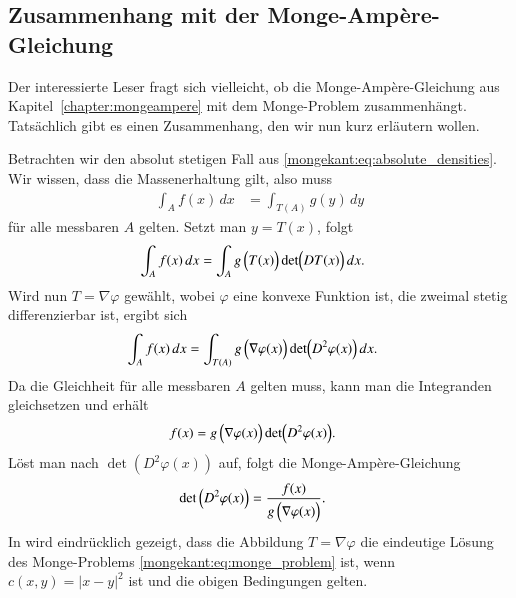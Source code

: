 \subsection{Zusammenhang mit der Monge-Ampère-Gleichung}
Der interessierte Leser fragt sich vielleicht,
ob die Monge-Ampère-Gleichung aus Kapitel~\ref{chapter:mongeampere}
mit dem Monge-Problem zusammenhängt.
Tatsächlich gibt es einen Zusammenhang,
den wir nun kurz erläutern wollen.

Betrachten wir den absolut stetigen Fall aus \eqref{mongekant:eq:absolute_densities}.
Wir wissen,
dass die Massenerhaltung gilt,
also muss
\begin{align*}
\int_{A} f(x) \, dx
&=
\int_{T(A)} g(y) \, dy
\end{align*}
für alle messbaren $A$ gelten.
Setzt man $y = T(x)$,
folgt
\begin{align*}
\int_{A} f(x) \, dx
&=
\int_{A} g\,\Bigl(T(x)\Bigr) \det\Bigl(DT(x)\Bigr) \, dx
.
\end{align*}
Wird nun $T = \nabla \varphi$ gewählt,
wobei $\varphi$ eine konvexe Funktion ist,
die zweimal stetig differenzierbar ist,
ergibt sich
\begin{align*}
\int_{A} f(x) \, dx
&=
\int_{T(A)} g\,\Bigl(\nabla \varphi(x)\Bigr) \det\Bigl(D^2 \varphi(x)\Bigr) \, dx
.
\end{align*}
Da die Gleichheit für alle messbaren $A$ gelten muss,
kann man die Integranden gleichsetzen und erhält
\begin{align*}
f(x)
&=
g\,\Bigl(\nabla \varphi(x)\Bigr) \det\Bigl(D^2 \varphi(x)\Bigr)
.
\end{align*}
Löst man nach $\det(D^2 \varphi(x))$ auf,
folgt die Monge-Ampère-Gleichung
\begin{align*}
\det\,\Bigl(D^2 \varphi(x)\Bigr)
&=
\frac{f(x)}{g\,\Bigl(\nabla \varphi(x)\Bigr)}
.
\end{align*}
In \cite{mongekant:brenier} wird eindrücklich gezeigt,
dass die Abbildung $T = \nabla \varphi$
die eindeutige Lösung des Monge-Problems \eqref{mongekant:eq:monge_problem} ist,
wenn $c(x,y) = \left\lvert x - y\right\rvert^2$ ist und die obigen Bedingungen gelten.

